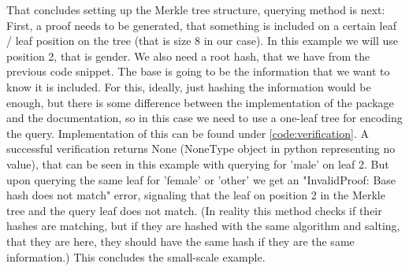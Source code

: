 \documentclass[a4paper,11pt]{report} %
\theoremstyle{change}
\theoremstyle{theoremstyle}
\begin{document}
That concludes setting up the Merkle tree structure, querying method is next:\\
\noindent First, a proof needs to be generated, that something is included on a certain leaf / leaf position on the tree (that is size 8 in our case). In this example we will use position 2, that is gender. We also need a root hash, that we have from the previous code snippet. The base is going to be the information that we want to know it is included. For this, ideally, just hashing the information would be enough, but there is some difference between the implementation of the package and the documentation, so in this case we need to use a one-leaf tree for encoding the query. Implementation of this can be found under \ref{code:verification}. A successful verification returns None (NoneType object in python representing no value), that can be seen in this example with querying for 'male' on leaf 2. But upon querying the same leaf for 'female' or 'other' we get an "InvalidProof: Base hash does not match" error, signaling that the leaf on position 2 in the Merkle tree and the query leaf does not match. (In reality this method checks if their hashes are matching, but if they are hashed with the same algorithm and salting, that they are here, they should have the same hash if they are the same information.) This concludes the small-scale example.\\
\end{document}
